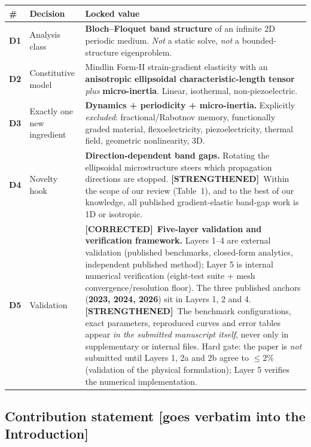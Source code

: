 \documentclass[11pt,a4paper]{article}
\newcommand{\bp}[1]{\textcolor{accent}{\textsf{\footnotesize [#1]}}}
\newcommand{\STR}{{\color{strcol}\textbf{[STRENGTHENED]}}}
\newcommand{\COR}{{\color{corcol}\textbf{[CORRECTED]}}}
\begin{document}
{\small
\begin{tabularx}{\textwidth}{@{}>{\bfseries}p{0.5cm} L{3.6cm} Y@{}}
\toprule
\# & Decision & Locked value \\
\midrule
D1 & Analysis class & \textbf{Bloch--Floquet band structure} of an infinite 2D periodic medium.
       \emph{Not} a static solve, \emph{not} a bounded-structure eigenproblem. \\
D2 & Constitutive model & Mindlin Form-II strain-gradient elasticity with an
       \textbf{anisotropic ellipsoidal characteristic-length tensor} \emph{plus}
       \textbf{micro-inertia}. Linear, isothermal, non-piezoelectric. \\
D3 & Exactly one new ingredient & \textbf{Dynamics + periodicity + micro-inertia.}
       Explicitly \emph{excluded}: fractional/Rabotnov memory, functionally graded
       material, flexoelectricity, piezoelectricity, thermal field, geometric
       nonlinearity, 3D. \\
D4 & Novelty hook & \textbf{Direction-dependent band gaps.} Rotating the ellipsoidal
       microstructure steers which propagation directions are stopped. \STR\ Within the scope of our review (Table~1), and to the best of our knowledge, all published gradient-elastic band-gap work is 1D or isotropic. \\
D5 & Validation & \COR\ \textbf{Five-layer validation and verification framework.} Layers 1--4 are external validation (published benchmarks, closed-form analytics, independent published method); Layer 5 is internal numerical verification (eight-test suite + mesh convergence/resolution floor). The three published anchors (\textbf{2023, 2024, 2026}) sit in Layers 1, 2 and 4. \STR\ The benchmark configurations, exact parameters, reproduced curves and error tables appear \emph{in the submitted manuscript itself}, never only in supplementary or internal files. Hard gate: the paper is \emph{not} submitted until Layers 1, 2a and 2b agree to $\le 2\%$ (validation of the physical formulation); Layer 5 verifies the numerical implementation. \\
\bottomrule
\end{tabularx}
}

\subsection{Contribution statement \bp{goes verbatim into the Introduction}}
\end{document}
